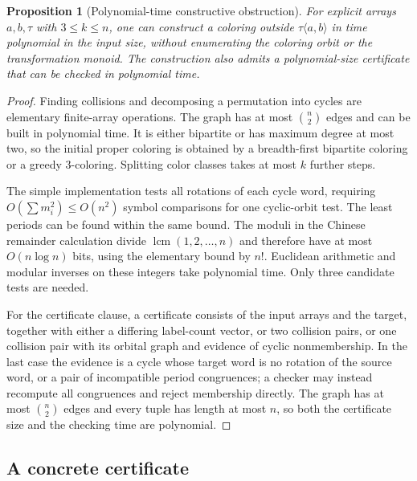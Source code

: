 \documentclass[11pt,a4paper]{article}
\numberwithin{equation}{section}
\newtheorem{proposition}[theorem]{Proposition}
\theoremstyle{definition}
\theoremstyle{remark}
\newcommand{\lcm}{\operatorname{lcm}}
\begin{document}
\begin{proposition}[Polynomial-time constructive obstruction]\label{prop:algorithm}
For explicit arrays $a,b,\tau$ with $3\le k\le n$, one can construct a
coloring outside $\tau\langle a,b\rangle$ in time polynomial in the input
size, without enumerating the coloring orbit or the transformation monoid.
The construction also admits a polynomial-size certificate that can be
checked in polynomial time.
\end{proposition}
\begin{proof}
Finding collisions and decomposing a permutation into cycles are elementary
finite-array operations. The graph has at most $\binom n2$ edges and can be
built in polynomial time. It is either bipartite or has maximum degree at
most two, so the initial proper coloring is obtained by a breadth-first
bipartite coloring or a greedy $3$-coloring. Splitting color classes takes at
most $k$ further steps.

The simple implementation tests all rotations of each cycle word, requiring
$O(\sum m_i^2)\le O(n^2)$ symbol comparisons for one cyclic-orbit test.
The least periods can be found within the same bound. The moduli in the
Chinese remainder calculation divide $\lcm(1,2,\ldots,n)$ and therefore
have at most $O(n\log n)$ bits, using the elementary bound by $n!$.
Euclidean arithmetic and modular inverses on these integers take polynomial
time. Only three candidate tests are needed.

For the certificate clause, a certificate consists of the input arrays and
the target, together with either a differing label-count vector, or two
collision pairs, or one collision pair with its orbital graph and evidence of
cyclic nonmembership. In the last case the evidence is a cycle whose target
word is no rotation of the source word, or a pair of incompatible period
congruences; a checker may instead recompute all congruences and reject
membership directly. The graph has at most $\binom n2$ edges and every tuple
has length at most $n$, so both the certificate size and the checking time
are polynomial.
\end{proof}

\subsection{A concrete certificate}
\end{document}

